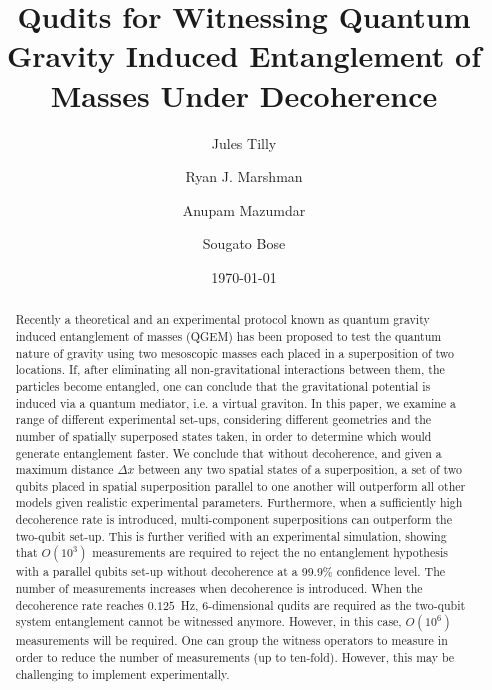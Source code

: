 \documentclass[%
 reprint,
 superscriptaddress,
 amsmath,
 amssymb,
 aps,
 longbibliography
]{revtex4-2}
\date{\today}
\begin{document}

\title{Qudits for Witnessing Quantum Gravity Induced Entanglement of Masses Under Decoherence}%

\author{Jules Tilly}
\author{Ryan J. Marshman}
 
\author{Anupam Mazumdar}
\author{Sougato Bose}






\begin{abstract}
Recently a theoretical and an experimental protocol known as quantum gravity induced entanglement of masses (QGEM) has been proposed to test the quantum nature of gravity using two mesoscopic masses each placed in a superposition of two locations. If, after eliminating all non-gravitational interactions between them, the particles become entangled, one can conclude that the gravitational potential is induced via a quantum mediator, i.e. a virtual graviton. In this paper, we examine a range of different experimental set-ups, considering different geometries and the number of spatially superposed states taken, in order to determine which would generate entanglement faster. We conclude that without decoherence, and given a maximum distance $\Delta x$ between any two spatial states of a superposition, a set of two qubits placed in spatial superposition parallel to one another will outperform all other models given realistic experimental parameters. Furthermore, when a sufficiently high decoherence rate is introduced, multi-component superpositions can outperform the two-qubit set-up. This is further verified with an experimental simulation, showing that $O(10^3)$ measurements are required to reject the no entanglement hypothesis with a parallel qubits set-up without decoherence at a 99.9$\%$ confidence level. The number of measurements increases when decoherence is introduced. When the decoherence rate reaches $0.125$~Hz, 6-dimensional qudits are required as the two-qubit system entanglement cannot be witnessed anymore. However, in this case, $O(10^6)$ measurements will be required. One can group the witness operators to measure in order to reduce the number of measurements (up to ten-fold). However, this may be challenging to implement experimentally.   

\end{abstract}
\end{document}
